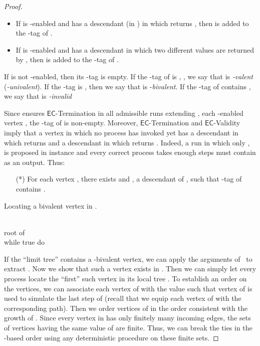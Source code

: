 \documentclass[11pt]{article}
\newcommand{\EC}{\ensuremath{\mathsf{EC}}}
\begin{document}
\begin{proof}
\begin{itemize}
\item If  is -enabled and has a
descendant (in ) in which  returns , then
 is added to the -tag of .

\item If  is -enabled and has a descendant in which two
different values are returned by , then  is added to
the -tag of .

\end{itemize}

If  is not -enabled, then its -tag is empty.
If the -tag of  is , , we say that
  is \emph{-valent} (\emph{-univalent}).  If the
-tag is ,  then we say that  is -\emph{bivalent}.
If the -tag of  contains , we say that  is \emph{-invalid}

Since  ensures \EC-Termination in all admissible runs extending ,
each -enabled vertex , the -tag of  is non-empty.
Moreover, \EC-Termination and \EC-Validity imply that a vertex
in which no process has invoked  yet has a
descendant in which  returns  and a
descendant in which  returns .
Indeed, a run in which only ,  is proposed in instance
 and every correct process takes enough steps must contain  as
an output.
Thus:

\begin{enumerate}
\item[(*)] For each vertex , there exists  and ,
a descendant of , such that -tag of  contains .
\end{enumerate}

\begin{algorithm}[t]
\caption{Locating a bivalent vertex in .}\label{alg:bivalent}
\footnotesize
\\
 root of \\
while true do\\

\normalsize
\end{algorithm}

If the ``limit tree''  contains a -bivalent vertex, we
can apply the arguments of~\cite{CHT96} to extract . Now we show that such a vertex exists in .  Then we
can simply let every process locate the ``first'' such vertex in its
local tree .
To establish an order on the vertices, we can associate
each vertex  of  with the value 
such that vertex  of  is used to
simulate the last step of  (recall that we equip
each vertex of  with the corresponding path).
Then we order vertices of  in the order consistent with the
growth of . Since every vertex in  has only finitely many
incoming edges, the sets of vertices having the same value of  are
finite.
Thus, we can break the ties in the -based order using any
deterministic procedure on these finite sets.


\end{proof}
\end{document}
